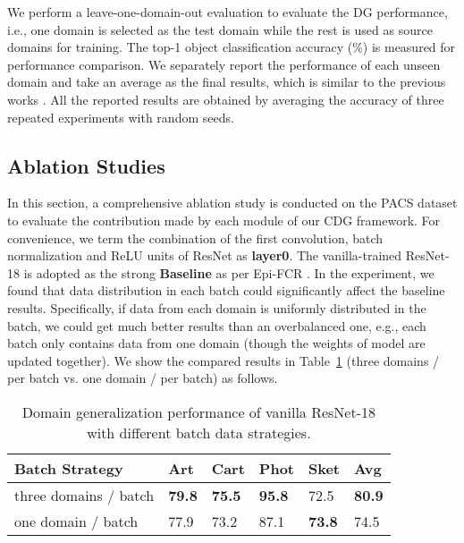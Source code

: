 We perform a leave-one-domain-out evaluation to evaluate the DG performance, i.e., one domain is selected as the test domain while the rest is used as source domains for training. The top-1 object classification accuracy (\%) is measured for performance comparison. We separately report the performance of each unseen domain and take an average as the final results, which is similar to the previous works \citep{huangRSC2020, balaji2018metareg, dou2019domain}. All the reported results are obtained by averaging the accuracy of three repeated experiments with random seeds.


\subsection{Ablation Studies}
In this section, a comprehensive ablation study is conducted on the PACS dataset to evaluate the contribution made by each module of our CDG framework. For convenience, we term the combination of the first convolution, batch normalization and ReLU units of ResNet as {\bf layer0}. The vanilla-trained ResNet-18 is adopted as the strong {\bf Baseline} as per Epi-FCR \citep{li2019episodic}. In the experiment, we found that data distribution in each batch could significantly affect the baseline results. Specifically, if data from each domain is uniformly distributed in the batch, we could get much better results than an overbalanced one, e.g., each batch only contains data from one domain (though the weights of model are updated together). We show the compared results in Table~\ref{tab:baseline} (three domains / per batch vs. one domain / per batch) as follows.

\begin{table}[htb]
  \caption{Domain generalization performance of vanilla ResNet-18 with different batch data strategies. }
  \label{tab:baseline}
  \begin{center}
    \begin{tabularx}{0.5\textwidth}{p{}<{\centering}|X<{\centering}|X<{\centering}|X<{\centering}|X<{\centering}|X<{\centering}}

      \toprule[0.6pt]
      Batch Strategy                                     & Art           & Cart       & Phot & Sket        & Avg           \\
      \midrule[0.4pt]
      three domains / batch                         & \textbf{79.8}  & \textbf{75.5} & \textbf{95.8}  & 72.5  & \textbf{80.9}          \\
      \midrule[0.4pt]
      one domain / batch                            & 77.9          & 73.2          & 87.1  & \textbf{73.8}  & 74.5         \\
      \bottomrule[0.6pt]
    \end{tabularx}
  \end{center}
\end{table}

